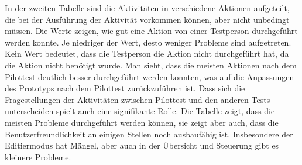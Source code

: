 In der zweiten Tabelle sind die Aktivitäten in verschiedene Aktionen aufgeteilt, die bei der Ausführung der Aktivität vorkommen können, aber nicht unbedingt müssen. Die Werte zeigen, wie gut eine Aktion von einer Testperson durchgeführt werden konnte. Je niedriger der Wert, desto weniger Probleme sind aufgetreten. Kein Wert bedeutet, dass die Testperson die Aktion nicht durchgeführt hat, da die Aktion nicht benötigt wurde. Man sieht, dass die meisten Aktionen nach dem Pilottest deutlich besser durchgeführt werden konnten, was auf die Anpassungen des Prototyps nach dem Pilottest zurückzuführen ist. Dass sich die Fragestellungen der Aktivitäten zwischen Pilottest und den anderen Tests unterscheiden spielt auch eine signifikante Rolle. Die Tabelle zeigt, dass die meisten Probleme durchgeführt werden können, sie zeigt aber auch, dass die Benutzerfreundlichkeit an einigen Stellen noch ausbaufähig ist. Insbesondere der Editiermodus hat Mängel, aber auch in der Übersicht und Steuerung gibt es kleinere Probleme.


